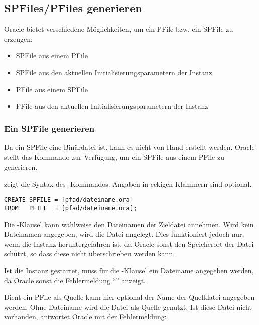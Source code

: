       \subsection{SPFiles/PFiles generieren}
        Oracle bietet verschiedene Möglichkeiten, um ein PFile bzw. ein SPFile zu erzeugen:
        \begin{itemize}
          \item SPFile aus einem PFile
          \item SPFile aus den aktuellen Initialisierungsparametern der Instanz
          \item PFile aus einem SPFile
          \item PFile aus den aktuellen Initialisierungsparametern der Instanz
        \end{itemize}
        \subsubsection{Ein SPFile generieren}
          Da ein SPFile eine Binärdatei ist, kann es nicht von Hand erstellt werden. Oracle stellt das Kommando  zur Verfügung, um ein SPFile aus einem PFile  zu generieren.

           zeigt die Syntax des -Kommandos. Angaben in eckigen Klammern sind optional.
          \begin{lstlisting}[caption={\languageorasql{CREATE SPFILE}},label=admin18,language=oracle_sql]
CREATE SPFILE = [pfad/dateiname.ora]
FROM   PFILE  = [pfad/dateiname.ora];
          \end{lstlisting}
          Die -Klausel kann wahlweise den Dateinamen der Zieldatei annehmen. Wird kein Dateinamen angegeben, wird die Datei  angelegt. Dies funktioniert jedoch nur, wenn die Instanz heruntergefahren ist, da Oracle sonst den Speicherort der Datei  schützt, so dass diese nicht überschrieben werden kann.
    
          \begin{merke}
            Ist die Instanz gestartet, muss für die -Klausel ein Dateiname angegeben werden, da Oracle sonst die Fehlermeldung \enquote{} anzeigt.
          \end{merke}

          Dient ein PFile als Quelle kann  hier optional der Name der Quelldatei angegeben werden. Ohne Dateiname wird die Datei  als Quelle genutzt. Ist diese Datei nicht vorhanden, antwortet Oracle mit der Fehlermeldung:

